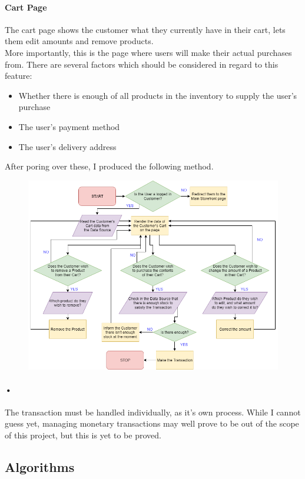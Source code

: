 \documentclass{article}
\begin{document}
    \paragraph{Cart Page}
    The cart page shows the customer what they currently have in their cart, lets them edit amounts  and remove products.\\
    More importantly, this is the page where users will make their actual purchases from.
    There are several factors which should be considered in regard to this feature:
    \begin{itemize}
    \item Whether there is enough of all products in the inventory to supply the user's purchase
    \item The user's payment method
    \item The user's delivery address
    \end{itemize}
    After poring over these, I produced the following method.
    \begin{figure}[h]
    \includegraphics[width=\textwidth]{cartPage.png}
    \centering
    \end{figure}
    \paragraph{•}
    The transaction must be handled individually, as it's own process.
    While I cannot guess yet, managing monetary transactions may well prove to be out of the scope of this project, but this is yet to be proved.
    \newpage
    \subsection{Algorithms}  
\end{document}
